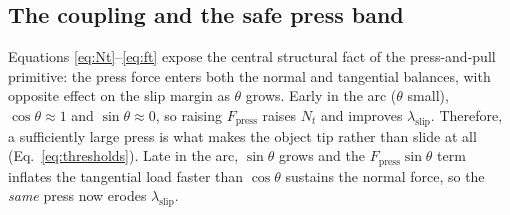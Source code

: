 \documentclass[10pt, conference]{IEEEtran}
\begin{document}

\subsection{The coupling and the safe press band}
Equations \eqref{eq:Nt}--\eqref{eq:ft} expose the central structural fact of the press-and-pull primitive: the press force enters both the normal and tangential balances, with opposite effect on the slip margin as $\theta$ grows. Early in the arc ($\theta$ small), $\cos\theta\approx 1$ and $\sin\theta\approx 0$, so raising $F_{\mathrm{press}}$ raises $N_t$ and improves $\lambda_{\mathrm{slip}}$. Therefore, a sufficiently large press is what makes the object tip rather than slide at all (Eq.~\eqref{eq:thresholds}). Late in the arc, $\sin\theta$ grows and the $F_{\mathrm{press}}\sin\theta$ term inflates the tangential load faster than $\cos\theta$ sustains the normal force, so the \emph{same} press now erodes $\lambda_{\mathrm{slip}}$.
\end{document}
